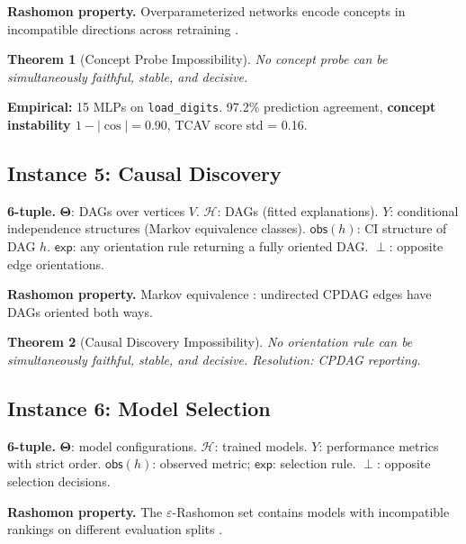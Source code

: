 \documentclass{article}
\newtheorem{theorem}{Theorem}
\newcommand{\Params}{\mathbf{\Theta}}
\newcommand{\sH}{\mathcal{H}}
\newcommand{\incomp}{\perp}
\begin{document}
\textbf{Rashomon property.}
Overparameterized networks encode concepts in incompatible directions across retraining \citep{bolukbasi2016man,kim2018tcav,ravfogel2020null}.

\begin{theorem}[Concept Probe Impossibility]
No concept probe can be simultaneously faithful, stable, and decisive.
\end{theorem}

\textbf{Empirical:} 15 MLPs on \texttt{load\_digits}. 97.2\% prediction agreement, \textbf{concept instability $1-|\cos| = 0.90$}, TCAV score std = 0.16.

\subsection{Instance 5: Causal Discovery}
\label{sec:inst-causal}

\textbf{6-tuple.}
$\Params$: DAGs over vertices $V$.
$\sH$: DAGs (fitted explanations).
$Y$: conditional independence structures (Markov equivalence classes).
$\mathsf{obs}(h)$: CI structure of DAG $h$.
$\mathsf{exp}$: any orientation rule returning a fully oriented DAG.
$\incomp$: opposite edge orientations.

\textbf{Rashomon property.}
Markov equivalence \citep{verma1991equivalence}: undirected CPDAG edges have DAGs oriented both ways.

\begin{theorem}[Causal Discovery Impossibility]
No orientation rule can be simultaneously faithful, stable, and decisive. Resolution: CPDAG reporting.
\end{theorem}

\subsection{Instance 6: Model Selection}
\label{sec:inst-ms}

\textbf{6-tuple.}
$\Params$: model configurations.
$\sH$: trained models.
$Y$: performance metrics with strict order.
$\mathsf{obs}(h)$: observed metric; $\mathsf{exp}$: selection rule.
$\incomp$: opposite selection decisions.

\textbf{Rashomon property.}
The $\varepsilon$-Rashomon set contains models with incompatible rankings on different evaluation splits \citep{fisher2019models,rudin2024amazing}.
\end{document}
